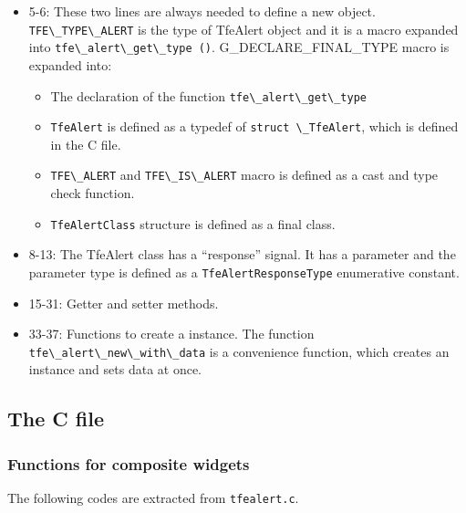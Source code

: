 \begin{itemize}
\tightlist
\item
  5-6: These two lines are always needed to define a new object.
  \passthrough{\lstinline!TFE\_TYPE\_ALERT!} is the type of TfeAlert
  object and it is a macro expanded into
  \passthrough{\lstinline!tfe\_alert\_get\_type ()!}.
  G\_DECLARE\_FINAL\_TYPE macro is expanded into:

  \begin{itemize}
  \tightlist
  \item
    The declaration of the function
    \passthrough{\lstinline!tfe\_alert\_get\_type!}
  \item
    \passthrough{\lstinline!TfeAlert!} is defined as a typedef of
    \passthrough{\lstinline!struct \_TfeAlert!}, which is defined in the
    C file.
  \item
    \passthrough{\lstinline!TFE\_ALERT!} and
    \passthrough{\lstinline!TFE\_IS\_ALERT!} macro is defined as a cast
    and type check function.
  \item
    \passthrough{\lstinline!TfeAlertClass!} structure is defined as a
    final class.
  \end{itemize}
\item
  8-13: The TfeAlert class has a ``response'' signal. It has a parameter
  and the parameter type is defined as a
  \passthrough{\lstinline!TfeAlertResponseType!} enumerative constant.
\item
  15-31: Getter and setter methods.
\item
  33-37: Functions to create a instance. The function
  \passthrough{\lstinline!tfe\_alert\_new\_with\_data!} is a convenience
  function, which creates an instance and sets data at once.
\end{itemize}

\subsection{The C file}\label{the-c-file}

\subsubsection{Functions for composite
widgets}\label{functions-for-composite-widgets}

The following codes are extracted from
\passthrough{\lstinline!tfealert.c!}.


